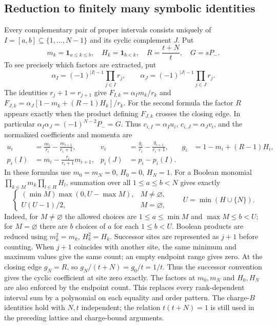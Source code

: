 \documentclass[11pt,a4paper]{article}
\numberwithin{equation}{section}
\theoremstyle{definition}\newtheorem{definition}[theorem]{Definition}
\theoremstyle{remark}\newtheorem{remark}[theorem]{Remark}
\begin{document}
\subsection*{Reduction to finitely many symbolic identities}
Every complementary pair of proper intervals consists uniquely of $I=[a,b]\subseteq\{1,\ldots,N-1\}$ and its cyclic complement $J$. Put
\[
 m_k=\mathbf1_{a\le k\le b},\quad H_k=\mathbf1_{b<k},\quad
 R=\frac{t+N}{t},\quad G=sP_-.
\]
To see precisely which factors are extracted, put
\[
 \alpha_I=(-1)^{|I|-1}\prod_{j\in I}r_j,\qquad
 \alpha_J=(-1)^{|J|-1}\prod_{j\in J}r_j.
\]
The identities $r_j+1=r_{j+1}$ give
$F_{I,k}=\alpha_I m_k/r_k$ and
$F_{J,k}=\alpha_J[1-m_k+(R-1)H_k]/r_k$.
For the second formula the factor $R$ appears exactly when the
product defining $F_{J,k}$ crosses the closing edge. In particular
$\alpha_I\alpha_J=(-1)^{N-2}P_-=G$.
Thus $c_{i,I}=\alpha_Iu_i$, $c_{i,J}=\alpha_Jv_i$, and the
normalized coefficients and momenta are
\begin{align*}
 u_i&=\frac{m_i}{r_i}-\frac{m_{i+1}}{r_i+1},&
 v_i&=\frac{g_i}{r_i}-\frac{g_{i+1}}{r_i+1},&
 g_i&=1-m_i+(R-1)H_i,\\
 p_i(I)&=m_i-\frac{r_i}{r_i+1}m_{i+1},&
 p_i(J)&=p_i-p_i(I).
\end{align*}
In these formulas use $m_0=m_N=0$, $H_0=0$, $H_N=1$. For a Boolean monomial $\prod_{k\in M}m_k\prod_{l\in H}H_l$, summation over all $1\le a\le b<N$ gives exactly
\[
 \begin{cases}
 (\min M)\max(0,U-\max M),&M\ne\varnothing,\\
 U(U-1)/2,&M=\varnothing,
 \end{cases}
 \qquad U=\min(H\cup\{N\}).
\]
Indeed, for $M\ne\varnothing$ the allowed choices are
$1\le a\le\min M$ and $\max M\le b<U$; for $M=\varnothing$
there are $b$ choices of $a$ for each $1\le b<U$.
Boolean products are reduced using $m_k^2=m_k$, $H_k^2=H_k$.
Successor sites are represented as $j+1$ before counting. When
$j+1$ coincides with another site, the same minimum and maximum
values give the same count; an empty endpoint range gives zero.
At the closing edge $g_N=R$, so
$g_N/(t+N)=g_0/t=1/t$. Thus the successor convention gives the
cyclic coefficient at site zero exactly. The factors at $m_0,m_N$
and $H_0,H_N$ are also enforced by the endpoint count.
This replaces every rank-dependent interval sum by a polynomial
on each equality and order pattern. The charge-$B$ identities
hold with $N,t$ independent; the relation $t(t+N)=1$ is still
used in the preceding lattice and charge-bound arguments.
\end{document}
